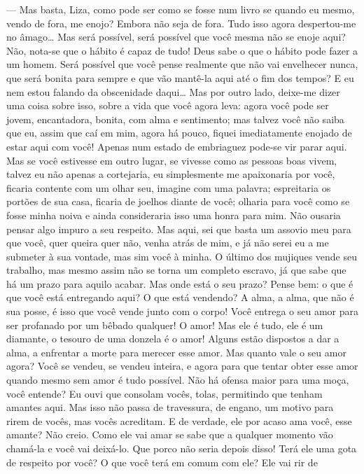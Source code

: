 --- Mas basta, Liza, como pode ser como se fosse num livro se quando eu
mesmo, vendo de fora, me enojo? Embora não seja de fora. Tudo isso
agora despertou-me no âmago\ldots{} Mas será possível, será possível que
você mesma não se enoje aqui? Não, nota-se que o hábito é capaz de
tudo! Deus sabe o que o hábito pode fazer a um homem. Será possível que
você pense realmente que não vai envelhecer nunca, que será bonita para
sempre e que vão mantê-la aqui até o fim dos tempos? E eu nem estou
falando da obscenidade daqui\ldots{} Mas por outro lado, deixe-me dizer uma
coisa sobre isso, sobre a vida que você agora leva: agora você pode ser
jovem, encantadora, bonita, com alma e sentimento; mas talvez você não
saiba que eu, assim que caí em mim, agora há pouco, fiquei
imediatamente enojado de estar aqui com você! Apenas num estado de
embriaguez pode-se vir parar aqui. Mas se você estivesse em outro
lugar, se vivesse como as pessoas boas vivem, talvez eu não apenas a
cortejaria, eu simplesmente me apaixonaria por você, ficaria contente
com um olhar seu, imagine com uma palavra; espreitaria os portões de
sua casa, ficaria de joelhos diante de você; olharia para você como se
fosse minha noiva e ainda consideraria isso uma honra para mim. Não
ousaria pensar algo impuro a seu respeito. Mas aqui, sei que basta um
assovio meu para que você, quer queira quer não, venha atrás de mim, e
já não serei eu a me submeter à sua vontade, mas sim você à minha. O
último dos mujiques vende seu trabalho, mas mesmo assim não se torna um
completo escravo, já que sabe que há um prazo para aquilo acabar. Mas
onde está o seu prazo? Pense bem: o que é que você está entregando
aqui? O que está vendendo? A alma, a alma, que não é sua posse, é isso
que você vende junto com o corpo! Você entrega o seu amor para ser
profanado por um bêbado qualquer! O amor! Mas ele é tudo, ele é um
diamante, o tesouro de uma donzela é o amor! Alguns estão dispostos a
dar a alma, a enfrentar a morte para merecer esse amor. Mas quanto vale
o seu amor agora? Você se vendeu, se vendeu inteira, e agora para que
tentar obter esse amor quando mesmo sem amor é tudo possível. Não há
ofensa maior para uma moça, você entende? Eu ouvi que consolam vocês,
tolas, permitindo que tenham amantes aqui. Mas isso não passa de
travessura, de engano, um motivo para rirem de vocês, mas vocês
acreditam. E de verdade, ele por acaso ama você, esse amante? Não
creio. Como ele vai amar se sabe que a qualquer momento vão chamá-la e
você vai deixá-lo. Que porco não seria depois disso! Terá ele uma gota
de respeito por você? O que você terá em comum com ele? Ele vai rir de
